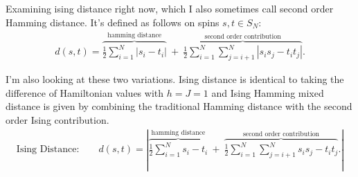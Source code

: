 Examining ising distance right now, which I also sometimes call second order Hamming distance. It's defined as follows on spins $s,t \in S_N$:
\begin{align*}
	d(s,t) = \overbrace{\frac{1}{2} \sum_{i=1}^N | s_i - t_i|}^{\text{hamming distance}} ~+~ \overbrace{\frac{1}{2} \sum_{i=1}^N\sum_{j=i+1}^N |s_is_j - t_it_j|}^{\text{second order contribution}}.
\end{align*}

I'm also looking at these two variations. Ising distance is identical to taking the difference of Hamiltonian values with $h = J = 1$ and Ising Hamming mixed distance is given by combining the traditional Hamming distance with the second order Ising contribution.
\begin{align*}
	\text{Ising Distance:} \hspace{2em} d(s,t) = \left|\overbrace{\frac{1}{2} \sum_{i=1}^N  s_i - t_i}^{\text{hamming distance}} ~+~ \overbrace{\frac{1}{2} \sum_{i=1}^N\sum_{j=i+1}^N s_is_j - t_it_j}^{\text{second order contribution}}.\right|
\end{align*}

